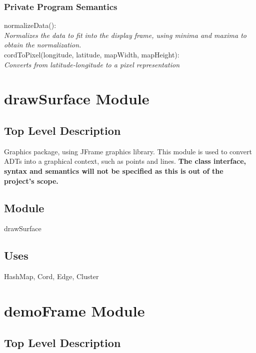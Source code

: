 \documentclass[12pt]{article}
\begin{document}
\subsubsection* {Private Program Semantics}
\noindent
normalizeData():\\
\textit{Normalizes the data to fit into the display frame, using minima and maxima to obtain
the normalization.}\\

\noindent
cordToPixel(longitude, latitude, mapWidth, mapHeight):\\
\textit{Converts from latitude-longitude to a pixel representation}


\newpage

\section*{drawSurface Module}

\subsection* {Top Level Description}

Graphics package, using JFrame graphics library. This module is used to convert ADTs into
a graphical context, such as points and lines. \textbf{The class interface, syntax and semantics will
not be specified as this is out of the project's scope.}

\subsection*{Module}

drawSurface

\subsection* {Uses}

HashMap, Cord, Edge, Cluster

\newpage

\section*{demoFrame Module}

\subsection* {Top Level Description}
\end{document}
